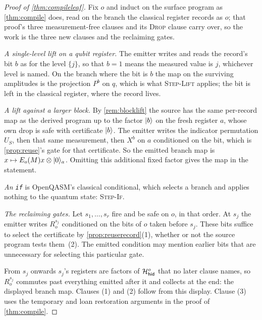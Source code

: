 \documentclass[acmsmall,screen,review,anonymous,nonacm]{acmart}
\begin{document}
\begin{proof}[Proof of \cref{thm:compileleaf}]
Fix $o$ and induct on the surface program as \cref{thm:compile} does, read on
the branch the classical register records as $o$; that proof's three
measurement-free clauses and its \textsc{Drop} clause carry over, so the work
is the three new clauses and the reclaiming gates.

\emph{A single-level lift on a qubit register.} The emitter writes
 and reads the record's bit $b$ as 
for the level $\{j\}$, so that $b = 1$ means the measured value is $j$, whichever
level is named. On the branch where the bit is $b$ the map on the
surviving amplitudes is the projection $P^{b}$ on $q$, which is what
\textsc{Step-Lift} applies; the bit is left in the classical register,
where the record lives.

\emph{A lift against a larger block.} By \cref{rem:blocklift} the source has
the same per-record map as the derived program up to the factor $\lvert b \rangle$ on
the fresh register $a$, whose own drop is safe with certificate $\lvert b \rangle$.
The emitter writes the indicator permutation $U_S$, then that same
measurement, then $X^{b}$ on $a$ conditioned on the bit, which is
\cref{prop:reuse}'s gate for that certificate. So the emitted branch map is
$x\mapsto E_o(M)x\otimes\lvert 0 \rangle_a$. Omitting this additional fixed
factor gives the map in the statement.

\emph{An \texttt{if}} is OpenQASM's classical conditional, which selects a
branch and applies nothing to the quantum state: \textsc{Step-If}.

\emph{The reclaiming gates.} Let $s_1, \ldots, s_r$ fire and be safe on $o$,
in that order. At $s_j$ the emitter writes $R^{s_j}_o$ conditioned on the
bits of $o$ taken before $s_j$. These bits suffice to select the
certificate by \cref{prop:reuserecord}(1), whether or not the source
program tests them~(2). The emitted condition may mention earlier bits
that are unnecessary for selecting this particular gate.

From $s_j$ onwards $s_j$'s registers are
factors of $\mathcal{H}_{\mathsf{hid}}^{o}$ that no later clause names, so $R^{s_j}_o$ commutes
past everything emitted after it and collects at the end: the displayed
branch map. Clauses (1) and (2) follow from this display. Clause (3) uses
the temporary and loan restoration arguments in the proof of
\cref{thm:compile}.
\end{proof}
\end{document}
